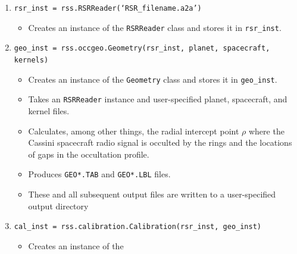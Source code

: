 \documentclass[titlepage, 12pt]{article}
\begin{document}
            \begin{enumerate}
                \item \small{\texttt{rsr\_inst =
                                     rss.RSRReader(`RSR\_filename.a2a')}}
                      \normalsize
                      \begin{itemize}
                          \item Creates an instance of the \texttt{RSRReader}
                                class and stores it in \texttt{rsr\_inst}.
                      \end{itemize}
                \item \small{\texttt{geo\_inst = rss.occgeo.Geometry(rsr\_inst,
                                     planet, spacecraft, kernels)}}
                      \normalsize
                      \begin{itemize}
                          \item Creates an instance of the
                                \texttt{Geometry} class and stores it
                                in \texttt{geo\_inst}.
                          \item Takes an \texttt{RSRReader} instance and
                                user-specified planet, spacecraft,
                                and kernel files.
                          \item Calculates, among other things,
                                the radial intercept point $\rho$ where the
                                Cassini spacecraft radio signal is occulted by
                                the rings and the locations
                                of gaps in the occultation profile.
                          \item Produces \texttt{GEO*.TAB}
                                and \texttt{GEO*.LBL} files.
                          \item These and all subsequent output files are
                                written to a user-specified output directory
                      \end{itemize}
                \item \small{\texttt{cal\_inst =
                                     rss.calibration.Calibration(rsr\_inst,
                                     geo\_inst)}}
                      \normalsize
                      \begin{itemize}
                          \item Creates an instance of the

\end{itemize}
\end{enumerate}
\end{document}
